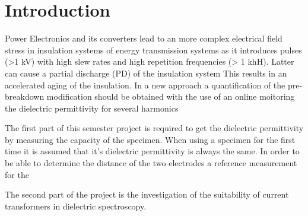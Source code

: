 
\chapter{Introduction}
Power Electronics and its converters lead to an more complex electrical field stress in insulation systems of energy transmission systems as it introduces pulses (>1 kV) with high slew rates and high repetition frequencies (> 1 khH). Latter can cause a partial discharge (PD) of the insulation system 
This results in an accelerated aging of the insulation. In a new approach a quantification of the pre-breakdown modification should be obtained with the use of an online moitoring the dielectric permittivity for several harmonics %

The first part of this semester project is required to get the dielectric permittivity by measuring the capacity of the specimen. When using a specimen for the first time it is assumed that it's dielectric permittivity is always the same. In order to be able to determine the distance of the two electrodes a reference measurement for the 

The second part of the project is the investigation of the suitability of current transformers in dielectric spectroscopy. 

